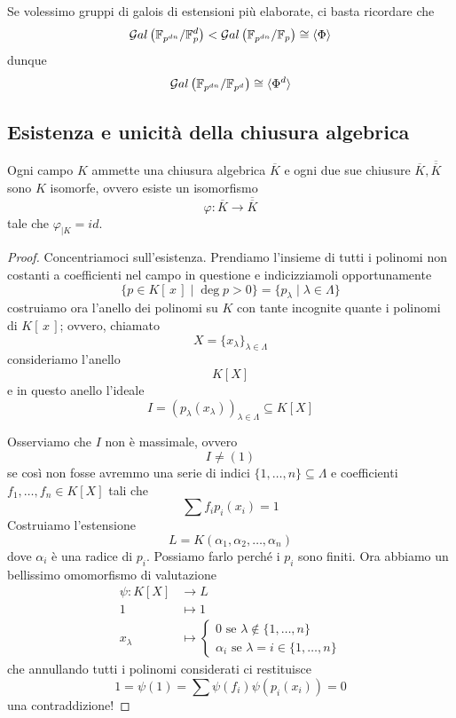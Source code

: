 \begin{multicols}{2}
	\begin{remark}
		Se volessimo gruppi di galois di estensioni più elaborate, ci basta ricordare che
		\[ \mathcal{G}al\left( \mathbb{F}_{p^{dn}} /\mathbb{F}_p^d \right) < \mathcal{G}al\left( \mathbb{F}_{p^{dn}} /\mathbb{F}_p \right) \cong \langle \Phi \rangle \]
		dunque
		\[ \mathcal{G}al\left( \mathbb{F}_{p^{dn}} /\mathbb{F}_{p^d} \right) \cong \langle \Phi^d \rangle \]
	\end{remark}
\end{multicols}

\subsection{Esistenza e unicità della chiusura algebrica}
\begin{multicols}{2}
	\begin{theorem}
		Ogni campo $ K $ ammette una chiusura algebrica $ \overline{K} $ e ogni due sue chiusure $ \overline{K}, \overline{\overline{K}} $ sono $ K $ isomorfe, ovvero esiste un isomorfismo
		\[ \varphi : \overline{K} \to \overline{\overline{K}} \]
		tale che $ \varphi_{|K} = id $.
	\end{theorem}

\begin{proof}
	Concentriamoci sull'esistenza. Prendiamo l'insieme di tutti i polinomi non costanti a coefficienti nel campo in questione e indicizziamoli opportunamente
	$$  \{ p \in K[\,x\,] \mid \deg p > 0 \} = \{p_\lambda \mid \lambda \in \Lambda\}  $$
	costruiamo ora l'anello dei polinomi su $ K $ con tante incognite quante i polinomi di $ K[\,x\,] $; ovvero, chiamato
	\[ X = \{ x_\lambda \}_{\lambda \in \Lambda} \]
	consideriamo l'anello
	\[ K[X] \]
	e in questo anello l'ideale
	\[ I = (p_{\lambda}(x_{\lambda}))_{\lambda \in \Lambda} \subseteq K[X] \]
	
	Osserviamo che $ I $ non è massimale, ovvero
	\[ I \neq (1) \]
	se così non fosse avremmo una serie di indici $ \{1, \dots, n\} \subseteq \Lambda $ e coefficienti $ f_1, \dots, f_n \in K[X] $ tali che
	\[ \sum f_i p_i(x_i) = 1 \]
	Costruiamo l'estensione 
	$$  L = K(\alpha_1, \alpha_2, \dots, \alpha_n)  $$
	dove $ \alpha_i $ è una radice di $ p_i $. Possiamo farlo perché i $ p_i $ sono finiti.
	Ora abbiamo un bellissimo omomorfismo di valutazione
	\begin{align*}
	\psi \colon K[X] &\to L \\
	1 &\mapsto 1 \\
	x_\lambda &\mapsto \begin{cases}
	0 \text{ se } \lambda \notin \{1, \dots, n\}\\
	\alpha_i \text{ se } \lambda = i \in \{1, \dots, n\}
	\end{cases} 
	\end{align*}
	che annullando tutti i polinomi considerati ci restituisce
	\[ 1 = \psi(1) = \sum \psi(f_i)\psi(p_i(x_i)) = 0 \]
	una contraddizione!
	

\end{proof}
\end{multicols}
